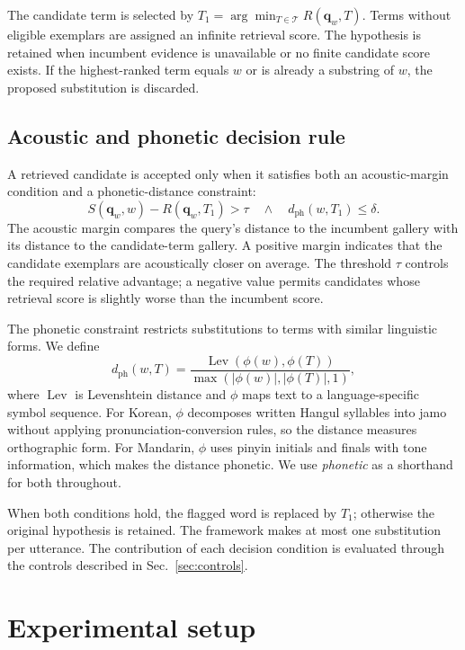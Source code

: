 \documentclass{article}
\newcommand{\Tlist}{\mathcal{T}}
\newcommand{\dph}{d_{\mathrm{ph}}}
\begin{document}
The candidate term is selected by
$T_1 = \arg\min_{T\in\Tlist} R(\mathbf{q}_w,T)$.
Terms without eligible exemplars are assigned an infinite retrieval score. The
hypothesis is retained when incumbent evidence is unavailable or no finite
candidate score exists. If the highest-ranked term equals $w$ or is already a
substring of $w$, the proposed substitution is discarded.

\subsection{Acoustic and phonetic decision rule}

A retrieved candidate is accepted only when it satisfies both an acoustic-margin condition and a phonetic-distance constraint:
\begin{equation}
S(\mathbf{q}_w,w)-R(\mathbf{q}_w,T_1)>\tau
\quad\land\quad
\dph(w,T_1)\leq\delta .
\label{eq:gate}
\end{equation}
The acoustic margin compares the query's distance to the incumbent gallery with its distance to the candidate-term gallery. A positive margin indicates that the candidate exemplars are acoustically closer on average. The threshold $\tau$ controls the required relative advantage; a negative value permits candidates whose retrieval score is slightly worse than the incumbent score.

The phonetic constraint restricts substitutions to terms with similar linguistic forms. We define
\begin{equation}
\dph(w,T) = \frac{\operatorname{Lev}\!\left(\phi(w),\phi(T)\right)}
                 {\max\!\left(|\phi(w)|,|\phi(T)|,1\right)} ,
\label{eq:dph}
\end{equation}
where $\operatorname{Lev}$ is Levenshtein distance and $\phi$ maps text to a language-specific symbol sequence. For Korean, $\phi$ decomposes written Hangul syllables into jamo without applying pronunciation-conversion rules, so the distance measures orthographic form. For Mandarin, $\phi$ uses pinyin initials and finals with tone information, which makes the distance phonetic. We use \emph{phonetic} as a shorthand for both throughout.


When both conditions hold, the flagged word is replaced by $T_1$; otherwise the original hypothesis is retained. The framework makes at most one substitution per utterance. The contribution of each decision condition is evaluated through the controls described in Sec.~\ref{sec:controls}.

\section{Experimental setup}
\label{sec:setup}
\end{document}

